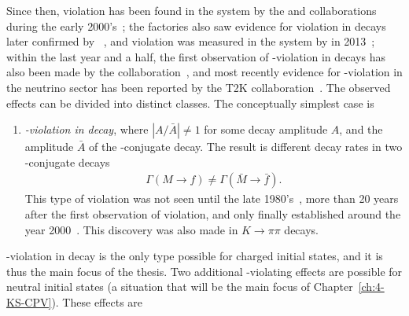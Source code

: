 Since then, \CP violation has been found in the \Bz system by the \babar and \belle collaborations during the early 2000's~\cite{boutignyObservationMathitCPViolation2001,bellecollaborationObservationLargeMathitCP2001}; the \B factories also saw evidence for \CP violation in \Bpm decays~\cite{BelleCombo,BabarCombo} later confirmed by \lhcb~\cite{LHCb-PAPER-2012-001}, and \CP violation was measured in the \Bs system by \lhcb in 2013~\cite{LHCb-PAPER-2013-018}; within the last year and a half, the first observation of \CP-violation in \Dz decays has also been made by the \lhcb collaboration~\cite{LHCb-PAPER-2019-006}, and most recently evidence for \CP-violation in the neutrino sector has been reported by the T2K collaboration~\cite{abeConstraintMatterAntimatter2020}. The observed effects can be divided into distinct classes. The conceptually simplest case is
\begin{enumerate}
    \item \emph{\CP-violation in decay}, where $|A / \bar A| \neq 1$ for some decay amplitude $A$, and the amplitude $\bar A$ of the \CP-conjugate decay. The result is different decay rates in two \CP-conjugate decays
    \begin{align}
        \Gamma (M\to f) \neq \Gamma (\bar M \to \bar f).
    \end{align}
    This type of \CP violation was not seen until the late 1980's~\cite{gibbonsMeasurementCPviolationParameter1993,barrNewMeasurementDirect1993}, more than 20 years after the first observation of \CP violation, and only finally established around the year 2000~\cite{batleyPrecisionMeasurementDirect2002,ktevcollaborationMeasurementsDirectMathrmCP2003}. This discovery was also made in $K\to\pi\pi$ decays. 
\end{enumerate}
\CP-violation in decay is the only type possible for charged initial states, and it is thus the main focus of the thesis. Two additional \CP-violating effects are possible for neutral initial states (a situation that will be the main focus of Chapter~\ref{ch:4-KS-CPV}). These effects are
